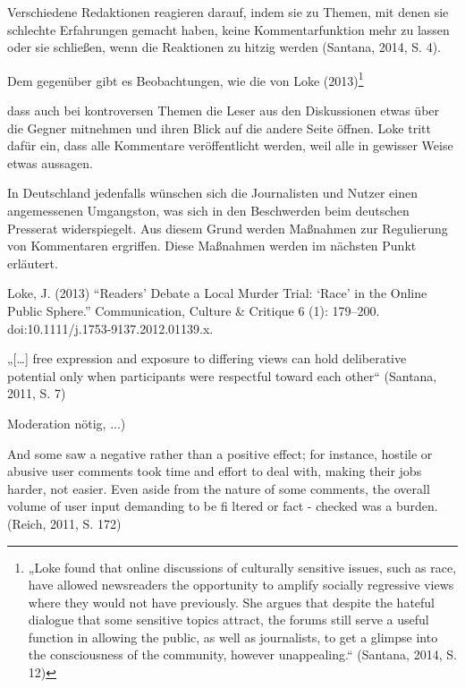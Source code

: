 Verschiedene Redaktionen reagieren darauf, indem sie zu Themen, mit denen sie
schlechte Erfahrungen gemacht haben, keine Kommentarfunktion mehr zu lassen oder
sie schließen, wenn die Reaktionen zu hitzig werden (Santana, 2014, S. 4). 

Dem gegenüber gibt es Beobachtungen, wie die von Loke (2013)\footnote{„Loke
found that online discussions of culturally sensitive issues, such as race, have
allowed newsreaders the opportunity to amplify socially regressive views where
they would not have previously. She argues that despite the hateful dialogue
that some sensitive topics attract, the forums still serve a useful function in
allowing the public, as well as journalists, to get a glimpse into the
consciousness of the community, however unappealing.“ (Santana, 2014, S. 12)}

dass auch bei kontroversen Themen die Leser aus den Diskussionen etwas über die
Gegner mitnehmen und ihren Blick auf die andere Seite öffnen. Loke tritt dafür
ein, dass alle Kommentare veröffentlicht werden, weil alle in gewisser Weise
etwas aussagen. 

In Deutschland jedenfalls wünschen sich die Journalisten und Nutzer einen
angemessenen Umgangston, was sich in den Beschwerden beim deutschen Presserat
widerspiegelt. Aus diesem Grund werden Maßnahmen zur Regulierung von Kommentaren
ergriffen. Diese Maßnahmen werden im nächsten Punkt erläutert.








Loke, J. (2013) “Readers’ Debate a Local Murder Trial: ‘Race’ in the Online
Public Sphere.” Communication, Culture \& Critique 6 (1): 179–200.
doi:10.1111/j.1753-9137.2012.01139.x.




„[\ldots] free expression and exposure to differing views can hold deliberative
potential only when participants were respectful toward each other“ (Santana,
2011, S. 7)







Moderation nötig, ...)


And some saw a negative rather than a positive effect; for instance, hostile or
abusive user comments took time and effort to deal with, making their jobs
harder, not easier. Even aside from the nature of some comments, the overall
volume of user input demanding to be fi ltered or fact - checked was a burden.
(Reich, 2011, S. 172)














